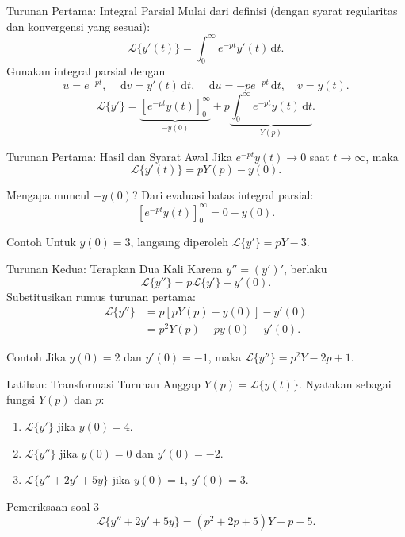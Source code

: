 \documentclass[aspectratio=169,11pt]{beamer}
\newcommand{\Lap}{\mathcal{L}}
\newcommand{\dd}{\,\mathrm{d}}
\begin{document}
\begin{frame}{Turunan Pertama: Integral Parsial}
Mulai dari definisi (dengan syarat regularitas dan konvergensi yang sesuai):
\[
\Lap\{y'(t)\}=\int_0^\infty e^{-pt}y'(t)\dd t.
\]
Gunakan integral parsial dengan
\[
u=e^{-pt},\quad \dd v=y'(t)\dd t,
\quad \dd u=-pe^{-pt}\dd t,\quad v=y(t).
\]
\[
\Lap\{y'\}=\underbrace{\left[e^{-pt}y(t)\right]_0^\infty}_{-y(0)}
+p\underbrace{\int_0^\infty e^{-pt}y(t)\dd t}_{Y(p)}.
\]
\end{frame}

\begin{frame}{Turunan Pertama: Hasil dan Syarat Awal}
Jika $e^{-pt}y(t)\to0$ saat $t\to\infty$, maka
\[
\boxed{\Lap\{y'(t)\}=pY(p)-y(0)}.
\]
\begin{block}{Mengapa muncul $-y(0)$?}
Dari evaluasi batas integral parsial:
\[
\left[e^{-pt}y(t)\right]_0^\infty=0-y(0).
\]
\end{block}
\begin{exampleblock}{Contoh}
Untuk $y(0)=3$, langsung diperoleh $\Lap\{y'\}=pY-3$.
\end{exampleblock}
\end{frame}

\begin{frame}{Turunan Kedua: Terapkan Dua Kali}
Karena $y''=(y')'$, berlaku
\[
\Lap\{y''\}=p\Lap\{y'\}-y'(0).
\]
Substitusikan rumus turunan pertama:
\[
\begin{aligned}
\Lap\{y''\}
&=p[pY(p)-y(0)]-y'(0)\\
&=\boxed{p^2Y(p)-py(0)-y'(0)}.
\end{aligned}
\]
\begin{exampleblock}{Contoh}
Jika $y(0)=2$ dan $y'(0)=-1$, maka $\Lap\{y''\}=p^2Y-2p+1$.
\end{exampleblock}
\end{frame}

\begin{frame}{Latihan: Transformasi Turunan}
Anggap $Y(p)=\Lap\{y(t)\}$. Nyatakan sebagai fungsi $Y(p)$ dan $p$:
\begin{enumerate}
\item $\Lap\{y'\}$ jika $y(0)=4$.
\item $\Lap\{y''\}$ jika $y(0)=0$ dan $y'(0)=-2$.
\item $\Lap\{y''+2y'+5y\}$ jika $y(0)=1$, $y'(0)=3$.
\end{enumerate}
\vspace{2mm}
\begin{block}{Pemeriksaan soal 3}
\[
\Lap\{y''+2y'+5y\}=(p^2+2p+5)Y-p-5.
\]
\end{block}
\end{frame}
\end{document}
